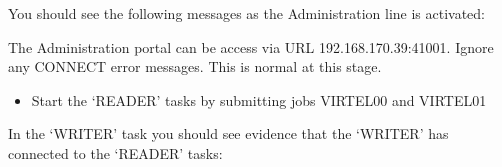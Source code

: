 \documentclass[letterpaper,10pt,english]{sphinxmanual}
\begin{document}
\sphinxAtStartPar
You should see the following messages as the Administration line is activated:\sphinxhyphen{}

\begin{sphinxVerbatim}[commandchars=\\\{\}]
         
     
        
            
\end{sphinxVerbatim}

\sphinxAtStartPar
The Administration portal can be access via URL 192.168.170.39:41001. Ignore any CONNECT error messages. This is normal at this stage.
\begin{itemize}
\item {} 
\sphinxAtStartPar
Start the ‘READER’ tasks by submitting jobs VIRTEL00 and VIRTEL01

\end{itemize}

\sphinxAtStartPar
In the ‘WRITER’ task you should see evidence that the ‘WRITER’ has connected to the ‘READER’ tasks:\sphinxhyphen{}
\end{document}
